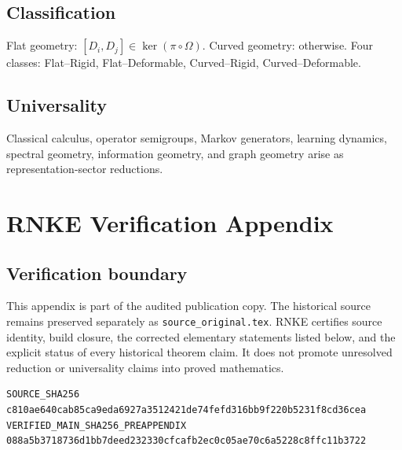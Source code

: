 \documentclass[12pt, oneside]{article}
\begin{document}
\subsection{Classification}
Flat geometry: $[D_i, D_j] \in \ker(\pi \circ \Omega)$. Curved geometry: otherwise. Four classes: Flat--Rigid, Flat--Deformable, Curved--Rigid, Curved--Deformable.

\subsection{Universality}
Classical calculus, operator semigroups, Markov generators, learning dynamics, spectral geometry, information geometry, and graph geometry arise as representation-sector reductions.

\clearpage
\section{RNKE Verification Appendix}
\subsection{Verification boundary}
This appendix is part of the audited publication copy. The historical source remains preserved separately as \texttt{source\_original.tex}. RNKE certifies source identity, build closure, the corrected elementary statements listed below, and the explicit status of every historical theorem claim. It does not promote unresolved reduction or universality claims into proved mathematics.

\begin{verbatim}
SOURCE_SHA256 c810ae640cab85ca9eda6927a3512421de74fefd316bb9f220b5231f8cd36cea
VERIFIED_MAIN_SHA256_PREAPPENDIX 088a5b3718736d1bb7deed232330cfcafb2ec0c05ae70c6a5228c8ffc11b3722
\end{verbatim}
\end{document}
